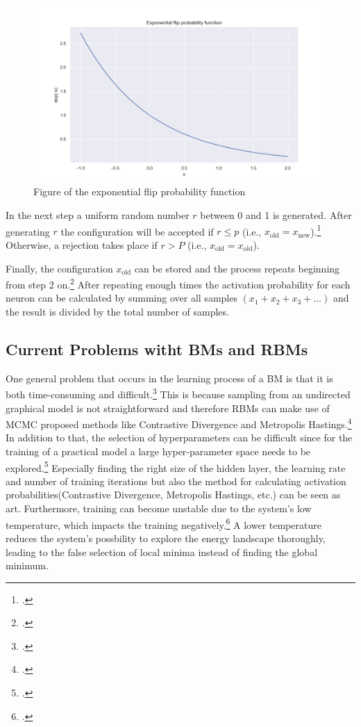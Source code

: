 \begin{figure}[H]
    \centering
    \includegraphics[width=0.7\linewidth]{graphics/Exponential flip probability function.png}
    \caption{Figure of the exponential flip probability function}
\end{figure}

In the next step a uniform random number $r$ between 0 and 1 is generated.
After generating $r$ the configuration will be accepted if $r \leq p$ (i.e., $x_{\text{old}}=x_{\text{new}}$).\footcite[cf.][2-3]{patronOptimalRelaxationRate2024}
Otherwise, a rejection takes place if $r > P$ (i.e., $x_{\text{old}}=x_{\text{old}}$).

Finally, the configuration $x_{\text{old}}$ can be stored and the process repeats beginning from step 2 on.\footcite[cf.][17]{patronOptimalRelaxationRate2024}
After repeating enough times the activation probability for each neuron can be calculated by summing over all samples $(x_1+x_2+x_3+\ldots)$ and the result is divided by the total number of samples.


\subsection{Current Problems witht BMs and RBMs}

One general problem that occurs in the learning process of a \ac{BM} is that it is both time-consuming and difficult.\footcite[cf.][1-2]{fischerIntroductionRestrictedBoltzmann2012}
This is because sampling from an undirected graphical model is not straightforward and therefore \ac{RBM}s can make use
of \ac{MCMC} proposed methods like Contrastive Divergence and Metropolis Hastings.\footcite[cf.][2]{fischerIntroductionRestrictedBoltzmann2012}
In addition to that, the selection of hyperparameters can be difficult since for the training of a practical model a large hyper-parameter space needs to be explored.\footcite[cf.][536]{larochelleClassificationUsingDiscriminative2008}
Especially finding the right size of the hidden layer, the learning rate and number of training iterations but also the method for calculating activation probabilities(Contrastive Divergence, Metropolis Hastings, etc.) can be seen as art.
Furthermore, training can become unstable due to the system's low temperature, which impacts the training negatively.\footcite[cf.][3-4]{huembeliPhysicsEnergybasedModels2022}
A lower temperature reduces the system's possbility to explore the energy landscape thoroughly, leading to the false selection of local minima instead of finding the global minimum.

